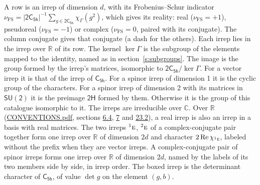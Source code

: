 \documentclass[10pt,a4paper]{article}
\numberwithin{equation}{section}
\newcommand{\grp}[1]{\mathsf{#1}}
\newcommand{\irr}[1]{\text{\normalfont\scshape #1}}
\newcommand{\conjpair}[1]{{}^{#1}}
\newcommand{\irchar}[1]{\chi_{#1}}
\newcommand{\fsind}{\nu_{\mathrm{FS}}}
\begin{document}
\leavevmode\label{n:index.frobenius}\label{n:head.irrep}\label{n:head.reality}A row is an irrep of dimension $d$, with its Frobenius--Schur indicator $\fsind = |\grp{2C_{5h}}|^{-1}\allowbreak\sum_{g\in\grp{2C_{5h}}}\irchar{\Gamma}(g^2)$, which gives its reality: real ($\fsind = +1$), pseudoreal ($\fsind = -1$) or complex ($\fsind = 0$, paired with its conjugate). \label{n:head.conjugate}The column conjugate gives that conjugate (a dash for the others). \label{n:head.over.real}Each irrep lies in the irrep over $\mathbb{R}$ of its row. \label{n:head.kernel}The kernel $\ker\Gamma$ is the subgroup of the elements mapped to the identity, named as in section~\ref{s:subgroups}. \label{n:head.image}The image is the group formed by the irrep's matrices, isomorphic to $\grp{2C_{5h}}/\ker\Gamma$. For a vector irrep it is that of the irrep of \href{../../../rotation/data/pdf/C5h.pdf}{$\grp{C_{5h}}$}. For a spinor irrep of dimension 1 it is the cyclic group of the characters. For a spinor irrep of dimension 2 with its matrices in $\grp{SU(2)}$ it is the preimage $\grp{2H}$ formed by them. Otherwise it is the group of this catalogue isomorphic to it. The irreps are irreducible over $\mathbb{C}$. Over $\mathbb{R}$ (\href{../../CONVENTIONS.pdf}{CONVENTIONS.pdf}, sections \href{../../../rotation/CONVENTIONS.pdf\#conv.6.4}{6.4}, \href{../../../rotation/CONVENTIONS.pdf\#conv.7}{7} and \href{../../CONVENTIONS.pdf\#conv.23.2}{23.2}), a real irrep is also an irrep in a basis with real matrices. The two irreps $\conjpair{1}\irr{e}$, $\conjpair{2}\irr{e}$ of a complex-conjugate pair together form one irrep over $\mathbb{R}$ of dimension $2d$ and character $2\operatorname{Re}\irchar{\conjpair{1}\irr{e}}$, labeled without the prefix when they are vector irreps. A complex-conjugate pair of spinor irreps forms one irrep over $\mathbb{R}$ of dimension $2d$, named by the labels of its two members side by side, in irrep order. \label{n:mark.determinant}The boxed irrep is the determinant character of \href{../../../rotation/data/pdf/C5h.pdf}{$\grp{C_{5h}}$}, of value $\det g$ on the element $(g, b)$.
\setlength{\emergencystretch}{2em}\par\setlength{\emergencystretch}{0pt}
\end{document}
